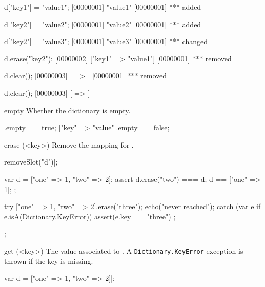 \begin{urbiscriptapi}
\begin{urbiscript}
d["key1"] = "value1";
[00000001] "value1"
[00000001] *** added

d["key2"] = "value2";
[00000001] "value2"
[00000001] *** added

d["key2"] = "value3";
[00000001] "value3"
[00000001] *** changed

d.erase("key2");
[00000002] ["key1" => "value1"]
[00000001] *** removed

d.clear();
[00000003] [ => ]
[00000001] *** removed

d.clear();
[00000003] [ => ]
\end{urbiscript}


\item[empty]
  Whether the dictionary is empty.

\begin{urbiassert}
[=>].empty == true;
["key" => "value"].empty == false;
\end{urbiassert}


\item[erase](<key>) Remove the mapping for .
\begin{urbicomment}
removeSlot("d")|;
\end{urbicomment}
\begin{urbiscript}
{
  var d = ["one" => 1, "two" => 2];
  assert
  {
    d.erase("two") === d;
    d == ["one" => 1];
  };

  try
  {
    ["one" => 1, "two" => 2].erase("three");
    echo("never reached");
  }
  catch (var e if e.isA(Dictionary.KeyError))
  {
    assert(e.key == "three")
  };
};
\end{urbiscript}





\item[get](<key>)%
  The value associated to .  A \lstinline|Dictionary.KeyError|
  exception is thrown if the key is missing.
\begin{urbiscript}
var d = ["one" => 1, "two" => 2]|;


\end{urbiscript}
\end{urbiscriptapi}
